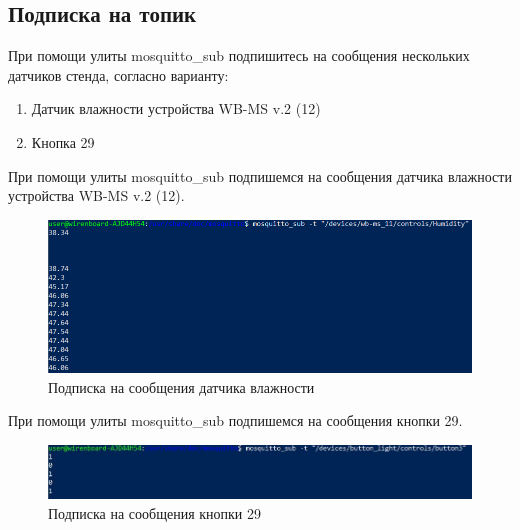 \documentclass[a4paper,14pt]{extarticle}
\begin{document}
	\subsection{Подписка на топик}
\begin{problem}
	При помощи улиты mosquitto\_sub подпишитесь на сообщения нескольких датчиков
	стенда, согласно варианту:
	\begin{enumerate}
		\item Датчик влажности устройства WB-MS v.2 (12)
		\item Кнопка 29
	\end{enumerate}

\nonum

При помощи улиты mosquitto\_sub подпишемся на сообщения датчика влажности устройства WB-MS v.2 (12).
\begin{figure}[htpb]
	\centering
	\includegraphics[width=0.9\linewidth]{images/ssh-powershell2}
	\caption{Подписка на сообщения датчика влажности}
	\label{fig:ssh-powershell2}
\end{figure}
При помощи улиты mosquitto\_sub подпишемся на сообщения кнопки 29.
\begin{figure}[htpb]
	\centering
	\includegraphics[width=0.9\linewidth]{images/ssh-powershell2.1}
	\caption{Подписка на сообщения кнопки 29}
	\label{fig:ssh-powershell2.1}
\end{figure}
\end{problem}	
	
	
\end{document}
